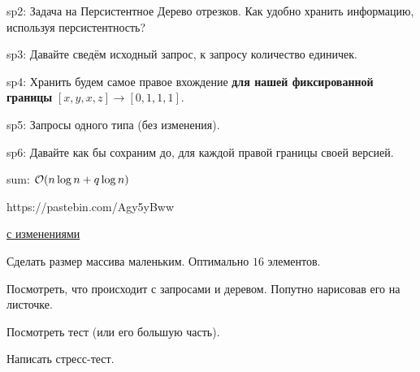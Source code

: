 sp2: Задача на Персистентное Дерево отрезков. Как удобно хранить информацию, используя персистентность?

sp3: Давайте сведём исходный запрос, к запросу количество единичек. 

sp4: Хранить будем самое правое вхождение {\bf для нашей фиксированной границы} $[x, y, x, z] \rightarrow [0, 1, 1, 1]$.

sp5: Запросы одного типа (без изменения).

sp6: Давайте как бы сохраним до, для каждой правой границы своей версией.

sum: $\mathcal{O}(n \log n + q \log n)$



https://pastebin.com/Agy5yBww


\href{https://pastebin.com/e4Ab7vMn}{с изменениями}




 




\up \up
\begin{MyList}[0pt]
	\item Сделать размер массива маленьким. Оптимально $16$ элементов.
	\item Посмотреть, что происходит с запросами и деревом. Попутно нарисовав его на листочке.
	\item Посмотреть тест (или его большую часть).
	\item Написать стресс-тест.
\end{MyList} \up \up

